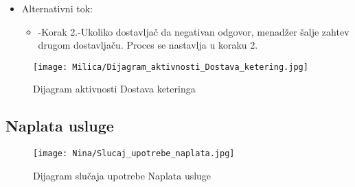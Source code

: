 \documentclass[a4paper]{article}
\begin{document}
      \begin{itemize}
        \item Alternativni tok:
          \begin{itemize}
        \item -Korak 2.-Ukoliko dostavljač da negativan odgovor, menadžer šalje zahtev drugom dostavljaču. Proces se nastavlja u koraku 2.
    \end{itemize}
    \end{itemize}
    
\begin{figure}[H]
    \centering
    \texttt{[image: Milica/Dijagram\_aktivnosti\_Dostava\_ketering.jpg]}
    \caption{Dijagram aktivnosti Dostava keteringa}
    \label{fig:RegistracijaZ}
\end{figure}



\subsection{Naplata usluge}

\begin{figure}[H]
    \centering
    \texttt{[image: Nina/Slucaj\_upotrebe\_naplata.jpg]}
    \caption{Dijagram slučaja upotrebe Naplata usluge}
    \label{fig:RegistracijaZ}
\end{figure}
\end{document}
